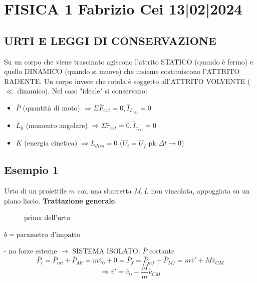 \section*{FISICA 1 Fabrizio Cei \hfill 13|02|2024}
\subsection*{URTI E LEGGI DI CONSERVAZIONE}
Su un corpo che viene trascinato agiscono l'attrito STATICO (quando è fermo) e quello DINAMICO (quando si muove) che insieme costituiscono l'ATTRITO RADENTE.
Un corpo invece che rotola è soggetto all'ATTRITO VOLVENTE ($\ll$ dinamico).
Nel caso "ideale" si conservano:
\begin{itemize}
    \item $\bar{P}$ (quantità di moto) $\Rightarrow \Sigma \bar{F}_{ext} = 0, \bar{I}_{F_{ext}} = 0$
    \item $\bar{L}_0$ (momento angolare) $\Rightarrow \Sigma \bar{\tau}_{ext} = 0, \bar{I}_{\tau_{ext}} = 0$
    \item $K$ (energia cinetica) $\Rightarrow L_{diss} = 0$ ($U_i = U_f$ pk $\Delta t \to 0$)
\end{itemize}

\subsection*{Esempio 1}
Urto di un proiettile $m$ con una sbarretta $M, L$ non vincolata, appoggiata su un piano liscio. \textbf{Trattazione generale}.

\begin{figure}[H]
\centering
{}
\caption*{prima dell'urto}
\end{figure}

$b = \text{parametro d'impatto}$

- no forze esterne $\rightarrow$ SISTEMA ISOLATO: $\bar{P}$ costante
$$ \bar{P}_i = \bar{P}_{mi} + \bar{P}_{Mi} = m\bar{v}_0 + 0 = \bar{P}_f = \bar{P}_{mf} + \bar{P}_{Mf} = m\bar{v}' + M\bar{v}_{CM} $$
$$ \Rightarrow \bar{v}' = \bar{v}_0 - \frac{M}{m} \bar{v}_{CM} $$

